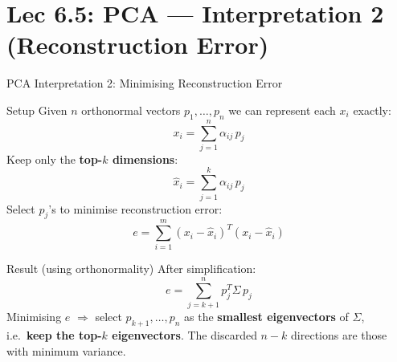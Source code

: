 \documentclass{beamer}
\begin{document}
\section{Lec 6.5: PCA --- Interpretation 2 (Reconstruction Error)}

\begin{frame}[shrink=10]{PCA Interpretation 2: Minimising Reconstruction Error}
  \begin{block}{Setup}
    Given $n$ orthonormal vectors $p_1,\ldots,p_n$ we can represent
    each $x_i$ exactly:
    \[
      x_i = \sum_{j=1}^{n}\alpha_{ij}\,p_j
    \]
    Keep only the \textbf{top-$k$ dimensions}:
    \[
      \hat{x}_i = \sum_{j=1}^{k}\alpha_{ij}\,p_j
    \]
    Select $p_j$'s to minimise reconstruction error:
    \[
      e = \sum_{i=1}^{m}(x_i-\hat{x}_i)^T(x_i-\hat{x}_i)
    \]
  \end{block}

  \medskip

  \begin{block}{Result (using orthonormality)}
    After simplification:
    \[
      e = \sum_{j=k+1}^{n} p_j^T\Sigma\,p_j
    \]
    Minimising $e$ $\Rightarrow$ select $p_{k+1},\ldots,p_n$ as the
    \textbf{smallest eigenvectors} of $\Sigma$, i.e.\
    \textbf{keep the top-$k$ eigenvectors}.
    The discarded $n-k$ directions are those with minimum variance.
  \end{block}
\end{frame}
\end{document}
